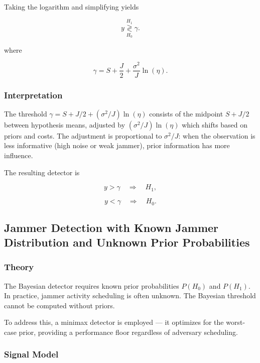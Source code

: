 \documentclass{article}
\begin{document}
Taking the logarithm and simplifying yields

\begin{equation}
y
\overset{H_1}{\underset{H_0}{\gtrless}}
\gamma.
\end{equation}

where

\begin{equation}
\gamma
=
S+\frac{J}{2}
+
\frac{\sigma^2}{J}\ln(\eta).
\end{equation}

\subsubsection{Interpretation}

The threshold $\gamma = S + J/2 + (\sigma^2/J)\ln(\eta)$ consists of the midpoint $S + J/2$ between hypothesis means, adjusted by $(\sigma^2/J)\ln(\eta)$ which shifts based on priors and costs. The adjustment is proportional to $\sigma^2/J$: when the observation is less informative (high noise or weak jammer), prior information has more influence.

The resulting detector is

\begin{equation}
y>\gamma
\quad\Rightarrow\quad H_1,
\end{equation}

\begin{equation}
y<\gamma
\quad\Rightarrow\quad H_0.
\end{equation}

\subsection{Jammer Detection with Known Jammer Distribution and Unknown Prior Probabilities}

\subsubsection{Theory}

The Bayesian detector requires known prior probabilities $P(H_0)$ and $P(H_1)$. In practice, jammer activity scheduling is often unknown. The Bayesian threshold cannot be computed without priors.

To address this, a minimax detector is employed — it optimizes for the worst-case prior, providing a performance floor regardless of adversary scheduling.

\subsubsection{Signal Model}
\end{document}
